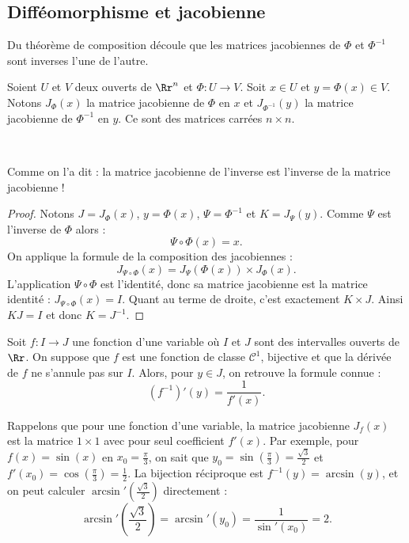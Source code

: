 \documentclass[11pt, class=report,crop=false]{standalone}
\begin{document}
\subsection{Difféomorphisme et jacobienne}

Du théorème de composition découle que les matrices jacobiennes de $\Phi$ et $\Phi^{-1}$ sont inverses l'une de l'autre.

Soient $U$ et $V$ deux ouverts de $\Rr^n$ et $\Phi:U\to V$.
Soit $x \in U$ et $y = \Phi(x) \in V$.
Notons $J_\Phi(x)$ la matrice jacobienne de $\Phi$ en $x$ 
et $J_{\Phi^{-1}}(y)$ la matrice jacobienne de $\Phi^{-1}$ en $y$.
Ce sont des matrices carrées $n\times n$.

\begin{proposition}
\label{prop:invjacob}
~
\end{proposition}
Comme on l'a dit : la matrice jacobienne de l'inverse est l'inverse de la matrice jacobienne !

\begin{proof}
Notons $J = J_\Phi(x)$, $y = \Phi(x)$,  $\Psi = \Phi^{-1}$ et $K = J_\Psi(y)$.
Comme $\Psi$ est l'inverse de $\Phi$ alors :
$$\Psi \circ \Phi (x) = x.$$
On applique la formule de la composition des jacobiennes :
$$J_{\Psi \circ \Phi}(x) = J_\Psi(\Phi(x)) \times J_\Phi(x).$$
L'application $\Psi \circ \Phi$ est l'identité, donc sa matrice jacobienne est la matrice identité : $J_{\Psi \circ \Phi}(x) = I$.
Quant au terme de droite, c'est exactement $K \times J$.
Ainsi $K J = I$ et donc $K = J^{-1}$.
\end{proof}


\begin{exemple}
Soit $f : I  \to J$ une fonction d'une variable où $I$ et $J$ sont des intervalles ouverts de $\Rr$. 
On suppose que $f$ est une fonction de classe $\mathcal{C}^1$, bijective et que la dérivée de $f$ ne s'annule pas sur $I$. Alors, pour $y\in J$, on retrouve la formule connue :
$$\left(f^{-1}\right)'(y) = \frac{1}{f'(x)}.$$

Rappelons que pour une fonction d'une variable, la matrice jacobienne $J_f(x)$ est la matrice $1 \times 1$ avec pour seul coefficient $f'(x)$.
Par exemple, pour $f(x) = \sin(x)$ en $x_0=\frac\pi3$, on sait que $y_0=\sin(\frac\pi3)=\frac{\sqrt3}2$ et $f'(x_0)=\cos(\frac\pi3)=\frac12$.
La bijection réciproque est $f^{-1}(y)=\arcsin(y)$, et on peut calculer $\arcsin'(\frac{\sqrt3}2)$ directement :
$$\arcsin'\left(\frac{\sqrt3}2\right) = \arcsin'(y_0) = \frac{1}{\sin'(x_0)} = 2.$$
\end{exemple}
\end{document}
